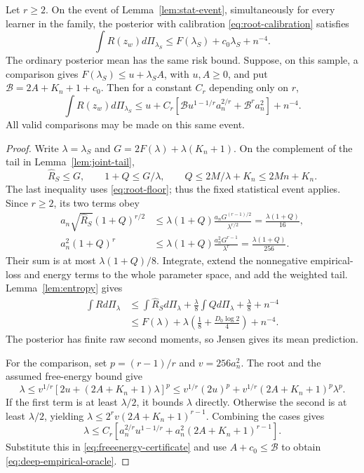 \begin{theorem}
\label{thm:deep-abstract}
Let $r\ge2$. On the event of Lemma~\ref{lem:stat-event}, simultaneously for every learner in the family, the posterior with calibration \eqref{eq:root-calibration} satisfies
\begin{equation}
 \int R(z_w)d\Pi_{\lambda_S}\le F(\lambda_S)+c_0\lambda_S+n^{-4}.
 \label{eq:freeenergy-certificate}
\end{equation}
The ordinary posterior mean has the same risk bound.
Suppose, on this sample, a comparison gives
$F(\lambda_S)\le u+\lambda_S A$, with $u,A\ge0$, and put
$\mathcal B=2A+K_n+1+c_0$. Then for a constant $C_r$ depending only on $r$,
\begin{equation}
 \int R(z_w)d\Pi_{\lambda_S}
 \le u+C_r\left[\mathcal B u^{1-1/r}a_n^{2/r}
                         +\mathcal B^r a_n^2\right]+n^{-4}.
 \label{eq:deep-empirical-oracle}
\end{equation}
All valid comparisons may be made on this same event.
\end{theorem}
\begin{proof}
Write $\lambda=\lambda_S$ and $G=2F(\lambda)+\lambda(K_n+1)$. On the complement of the tail in Lemma~\ref{lem:joint-tail},
\[
 \widehat R_S\le G,\qquad 1+Q\le G/\lambda,
 \qquad Q\le2M/\lambda+K_n\le2Mn+K_n.
\]
The last inequality uses \eqref{eq:root-floor}; thus the fixed statistical event applies. Since $r\ge2$, its two terms obey
\begin{align*}
 a_n\sqrt{\widehat R_S}(1+Q)^{r/2}
 &\le\lambda(1+Q)\frac{a_nG^{(r-1)/2}}{\lambda^{r/2}}
 =\frac{\lambda(1+Q)}{16},\\
 a_n^2(1+Q)^r
 &\le\lambda(1+Q)\frac{a_n^2G^{r-1}}{\lambda^r}
 =\frac{\lambda(1+Q)}{256}.
\end{align*}
Their sum is at most $\lambda(1+Q)/8$. Integrate, extend the nonnegative empirical-loss and energy terms to the whole parameter space, and add the weighted tail. Lemma~\ref{lem:entropy} gives
\begin{align*}
 \int Rd\Pi_\lambda
 &\le\int\widehat R_Sd\Pi_\lambda+\frac\lambda8\int Qd\Pi_\lambda
                  +\frac\lambda8+n^{-4}\\
 &\le F(\lambda)+\lambda\left(\frac18+\frac{D_0\log2}{4}\right)+n^{-4}.
\end{align*}
The posterior has finite raw second moments, so Jensen gives its mean prediction.

For the comparison, set $p=(r-1)/r$ and $v=256a_n^2$. The root and the assumed free-energy bound give
\[
 \lambda\le v^{1/r}[2u+(2A+K_n+1)\lambda]^p
 \le v^{1/r}(2u)^p+v^{1/r}(2A+K_n+1)^p\lambda^p.
\]
If the first term is at least $\lambda/2$, it bounds $\lambda$ directly. Otherwise the second is at least $\lambda/2$, yielding
$\lambda\le2^rv(2A+K_n+1)^{r-1}$. Combining the cases gives
\[
 \lambda\le C_r\left[a_n^{2/r}u^{1-1/r}
                  +a_n^2(2A+K_n+1)^{r-1}\right].
\]
Substitute this in \eqref{eq:freeenergy-certificate} and use
$A+c_0\le\mathcal B$ to obtain \eqref{eq:deep-empirical-oracle}.
\end{proof}

